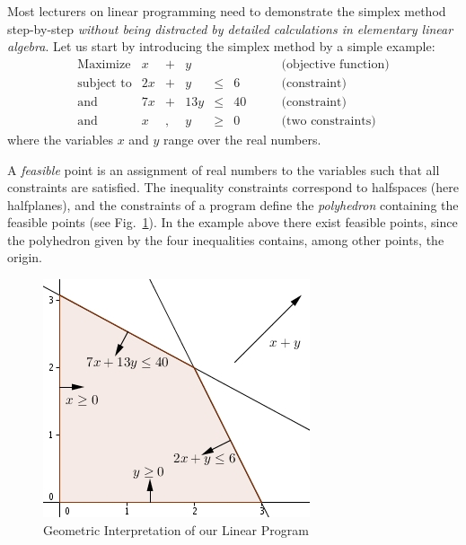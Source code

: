 \documentclass[ukenglish]{nik}
\begin{document}
Most lecturers on linear programming need to demonstrate the simplex method step-by-step 
\emph{without being distracted by detailed calculations in elementary linear algebra}. Let us start by
introducing the simplex method by a simple example:
\[
    \begin{array}{lrcrcrl}
			\text{Maximize}  &    x &+&    y &	&	& \quad\quad \text{(objective function)}\\
			\text{subject to}&  2 x &+&    y &\leq&   6	& \quad\quad \text{(constraint)}\\
    	\text{and}&         7 x &+& 13 y &\leq&  40 & \quad\quad \text{(constraint)}\\
    	\text{and}       &    x &,&    y &\geq&0    &\quad\quad \text{(two constraints)}
    \end{array}
\]
where the variables $x$ and $y$ range over the real numbers.

A \emph{feasible} point is an assignment of real numbers to the variables 
such that all constraints are satisfied. 
The inequality constraints correspond to halfspaces (here halfplanes), and the constraints of a program 
define the \emph{polyhedron} containing the feasible points (see Fig.~\ref{fig:ex1}).
In the example above there exist feasible points,
since the polyhedron given by the four inequalities contains,
among other points, the origin. 

\begin{figure}[htb]
	\begin{center}
		\includegraphics{ex1.jpg}
	\end{center}
	\caption{Geometric Interpretation of our Linear Program}
	\label{fig:ex1}
\end{figure}
\end{document}

